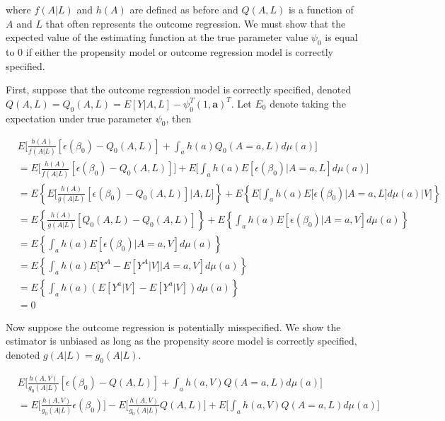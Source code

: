 \documentclass[12pt]{article}
\begin{document}
where $f(A|L)$ and $h(A)$ are defined as before and $Q(A, L)$ is a function of $A$ and $L$ that often represents the outcome regression. We must show that the expected value of the estimating function at the true parameter value $\psi_{0}$ is equal to 0 if either the propensity model or outcome regression model is correctly specified.

First, suppose that the outcome regression model is correctly specified, denoted $Q(A, L) = Q_{0}(A, L) = E[Y | A, L] - \psi_{0}^{T}(1, \bm{a})^{T}$. Let $E_{0}$ denote taking the expectation under true parameter $\psi_{0}$, then

\begin{align*}
&E \bigg[\frac{h(A)}{f(A | L)}[\epsilon(\beta_{0}) - Q_{0}(A, L)] + \int_{a} h(a)Q_{0}(A = a, L)d\mu (a) \bigg] \\
&= E \bigg[\frac{h(A)}{f(A | L)}[\epsilon(\beta_{0}) - Q_{0}(A, L)] \bigg] + E \bigg[\int_{a} h(a)E[\epsilon(\beta_{0}) | A = a, L]d\mu (a) \bigg] \\
&= E \left \{ E \bigg[\frac{h(A)}{g(A | L)}[\epsilon(\beta_{0}) - Q_{0}(A, L)] | A, L \bigg] \right \} + E \left \{ E \bigg[\int_{a} h(a)E[\epsilon(\beta_{0}) | A = a, L]d\mu (a) | V \bigg] \right \} \\
&= E \left \{ \frac{h(A)}{g(A | L)}[Q_{0}(A, L) - Q_{0}(A, L)] \right \} + E \left \{ \int_{a} h(a)E[\epsilon(\beta_{0}) | A = a, V]d\mu (a) \right \} \\
&= E \left \{ \int_{a} h(a)E[\epsilon(\beta_{0}) | A = a, V]d\mu (a) \right \} \\
&= E \left \{ \int_{a} h(a)E[Y^{A} - E[Y^{A} | V] | A = a, V]d\mu (a) \right \} \\
&= E \left \{ \int_{a} h(a)(E[Y^{a} | V] - E[Y^{a} |V])d\mu (a) \right \} \\
&= 0
\end{align*}


Now suppose the outcome regression is potentially misspecified. We show the estimator is unbiased as long as the propensity score model is correctly specified, denoted $g(A|L) = g_{0}(A|L)$.

\begin{align*}
&E \bigg[\frac{h(A, V)}{g_{0}(A | L)}[\epsilon(\beta_{0}) - Q(A, L)] + \int_{a} h(a, V)Q(A = a, L)d\mu (a) \bigg] \\
&= E \bigg[\frac{h(A, V)}{g_{0}(A | L)}\epsilon(\beta_{0}) \bigg] - E \bigg[\frac{h(A, V)}{g_{0}(A | L)}Q(A, L) \bigg] + E \bigg[ \int_{a} h(a, V)Q(A = a, L)d\mu (a) \bigg]
\end{align*}
\end{document}
